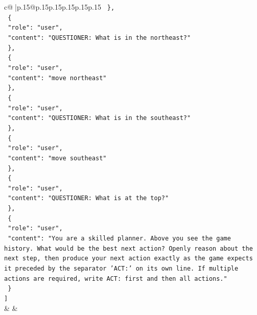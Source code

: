 \documentclass{article}
\begin{document}
{\begin{supertabular}{c@{$\;$}|p{.15\linewidth}@{}p{.15\linewidth}p{.15\linewidth}p{.15\linewidth}p{.15\linewidth}p{.15\linewidth}}
{{{\texttt{  \},} \\
\texttt{  \{} \\
\texttt{    "role": "user",} \\
\texttt{    "content": "QUESTIONER: What is in the northeast?"} \\
\texttt{  \},} \\
\texttt{  \{} \\
\texttt{    "role": "user",} \\
\texttt{    "content": "move northeast"} \\
\texttt{  \},} \\
\texttt{  \{} \\
\texttt{    "role": "user",} \\
\texttt{    "content": "QUESTIONER: What is in the southeast?"} \\
\texttt{  \},} \\
\texttt{  \{} \\
\texttt{    "role": "user",} \\
\texttt{    "content": "move southeast"} \\
\texttt{  \},} \\
\texttt{  \{} \\
\texttt{    "role": "user",} \\
\texttt{    "content": "QUESTIONER: What is at the top?"} \\
\texttt{  \},} \\
\texttt{  \{} \\
\texttt{    "role": "user",} \\
\texttt{    "content": "You are a skilled planner. Above you see the game history. What would be the best next action? Openly reason about the next step, then produce your next action exactly as the game expects it preceded by the separator 'ACT:' on its own line. If multiple actions are required, write ACT: first and then all actions."} \\
\texttt{  \}} \\
\texttt{{]}} \\
            }
        }
    }
    & & \\ \\


\end{supertabular}}
\end{document}
